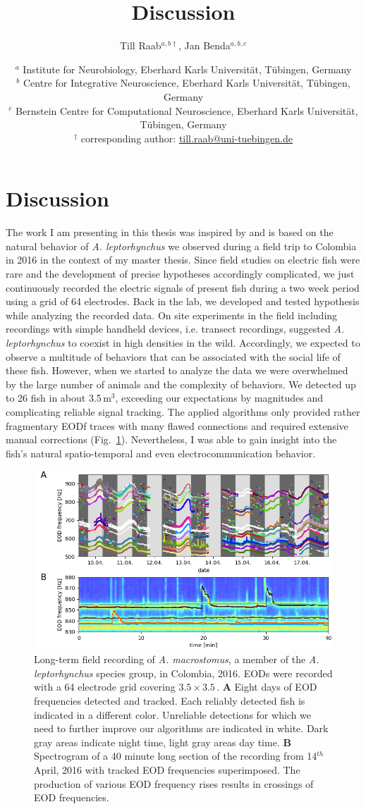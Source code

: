 \documentclass[11pt,pdftex]{article}
\title{Discussion}
\author{Till Raab$^{a,b\dagger}$, Jan Benda$^{a,b,c}$}
\date{\normalsize $^a$ Institute for Neurobiology, Eberhard Karls Universit\"at, T\"ubingen, Germany\\
  $^b$ Centre for Integrative Neuroscience, Eberhard Karls Universit\"at, T\"ubingen, Germany\\
  $^c$ Bernstein Centre for Computational Neuroscience, Eberhard Karls Universit\"at, T\"ubingen, Germany\\
$^{\dagger}$ corresponding author: \url{till.raab@uni-tuebingen.de}
}
\newcommand{\figitem}[1]{\textsf{\bfseries\uppercase{#1}}\penalty10000 }
\newcommand{\fref}[1]{\textup{\ref{#1}}}
\newcommand{\fig}{Fig.}
\newcommand{\figref}[1]{\fig~\fref{#1}}
\newcommand{\lepto}{\textit{A. leptorhynchus}}
\newcommand{\macros}{\textit{A. macrostomus}}
\begin{document}

\section{Discussion}

The work I am presenting in this thesis was inspired by and is based on the natural behavior of \lepto{} we observed during a field trip to Colombia in 2016 in the context of my master thesis. Since field studies on electric fish were rare and the development of precise hypotheses accordingly complicated, we just continuously recorded the electric signals of present fish during a two week period using a grid of 64 electrodes. Back in the lab, we developed and tested hypothesis while analyzing the recorded data. On site experiments in the field including recordings with simple handheld devices, i.e. transect recordings, suggested \lepto{} to coexist in high densities in the wild. Accordingly, we expected to observe a multitude of behaviors that can be associated with the social life of these fish. However, when we started to analyze the data we were overwhelmed by the large number of animals and the complexity of behaviors. We detected up to 26 fish in about 3.5\,m$^3$, exceeding our expectations by magnitudes and complicating reliable signal tracking. The applied algorithms only provided rather fragmentary EODf traces with many flawed connections and required extensive manual corrections (\figref{Colombia_traces}). Nevertheless, I was able to gain insight into the fish's natural spatio-temporal and even electrocommunication behavior.

\begin{figure}[h!]
  \centerline{\includegraphics[width=1\textwidth]{traces}}
  \caption{\label{Colombia_traces} Long-term field recording of \macros{}, a member of the \lepto{} species group, in Colombia, 2016. EODs were recorded with a 64 electrode grid covering $3.5 \times 3.5$\,\meter\squared. \figitem{A} Eight days of EOD frequencies detected and tracked. Each reliably detected fish is indicated in a different color. Unreliable detections for which we need to further improve our algorithms are indicated in white. Dark gray areas indicate night time, light gray areas day time. \figitem{B} Spectrogram of a 40 minute long section of the recording from 14$^{th}$ April, 2016 with tracked EOD frequencies superimposed. The production of various EOD frequency rises results in crossings of EOD frequencies.}
\end{figure}
\end{document}
